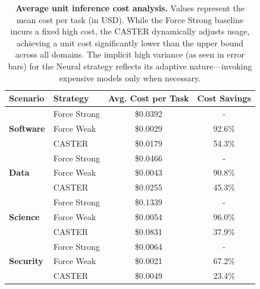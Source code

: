 \documentclass{article}
\theoremstyle{plain}
\theoremstyle{definition}
\theoremstyle{remark}
\begin{document}
\begin{table}[t]
    \centering
    \caption{\textbf{Average unit inference cost analysis.} Values represent the mean cost per task (in USD). While the Force Strong baseline incurs a fixed high cost, the CASTER dynamically adjusts usage, achieving a unit cost significantly lower than the upper bound across all domains. The implicit high variance (as seen in error bars) for the Neural strategy reflects its adaptive nature—invoking expensive models only when necessary.}
    \label{tab:avg_unit_cost}
    \begin{tabular}{llcc}
        \toprule
        \textbf{Scenario} & \textbf{Strategy} & \textbf{Avg. Cost per Task} & \textbf{Cost Savings} \\
        \midrule
        \multirow{3}{*}{\textbf{Software}} 
        & Force Strong & \$0.0392 & - \\ %
        & Force Weak   & \$0.0029 & 92.6\% \\
        & CASTER& \$0.0179 & 54.3\% \\ 
        \midrule
        \multirow{3}{*}{\textbf{Data}} 
        & Force Strong & \$0.0466 & - \\ %
        & Force Weak   & \$0.0043 & 90.8\% \\
        & CASTER& \$0.0255 & 45.3\% \\ 
        \midrule
        \multirow{3}{*}{\textbf{Science}} 
        & Force Strong & \$0.1339 & - \\ %
        & Force Weak   & \$0.0054 & 96.0\% \\
        & CASTER& \$0.0831 & 37.9\% \\ 
        \midrule
        \multirow{3}{*}{\textbf{Security}} 
        & Force Strong & \$0.0064 & - \\ %
        & Force Weak   & \$0.0021 & 67.2\% \\
        & CASTER& \$0.0049 & 23.4\% \\ 
        \bottomrule
    \end{tabular}
\end{table}
\end{document}

